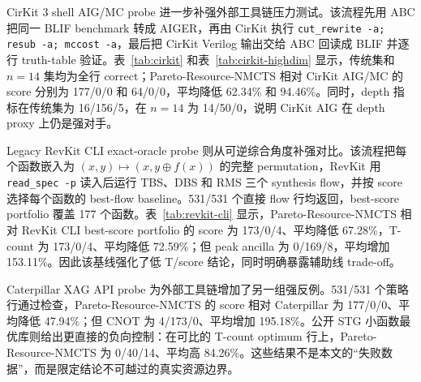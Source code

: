 \documentclass[UTF8,fontset=macnew,11pt]{ctexart}
\newcommand{\method}{Resource-NMCTS}
\newcommand{\xor}{\ensuremath{\oplus}}
\begin{document}
CirKit 3 shell AIG/MC probe 进一步补强外部工具链压力测试。该流程先用 ABC 把同一 BLIF benchmark 转成 AIGER，再由 CirKit 执行 \texttt{cut\_rewrite -a; resub -a; mccost -a}，最后把 CirKit Verilog 输出交给 ABC 回读成 BLIF 并逐行 truth-table 验证。表~\ref{tab:cirkit} 和表~\ref{tab:cirkit-highdim} 显示，传统集和 $n=14$ 集均为全行 correct；Pareto-\method{} 相对 CirKit AIG/MC 的 score 分别为 177/0/0 和 64/0/0，平均降低 62.34\% 和 94.46\%。同时，depth 指标在传统集为 16/156/5，在 $n=14$ 为 14/50/0，说明 CirKit AIG 在 depth proxy 上仍是强对手。

\begin{table}[H]
\centering
\small
\caption{CirKit 3 shell AIG/MC probe：$n\leq6$ 传统函数。负值表示目标方法资源更低。}
\label{tab:cirkit}

\end{table}

\begin{table}[H]
\centering
\small
\caption{CirKit 3 shell AIG/MC probe：$n=14$ 高维函数。负值表示目标方法资源更低。}
\label{tab:cirkit-highdim}

\end{table}

Legacy RevKit CLI exact-oracle probe 则从可逆综合角度补强对比。该流程把每个函数嵌入为 $(x,y)\mapsto(x,y\xor f(x))$ 的完整 permutation，RevKit 用 \texttt{read\_spec -p} 读入后运行 TBS、DBS 和 RMS 三个 synthesis flow，并按 score 选择每个函数的 best-flow baseline。531/531 个直接 flow 行均返回，best-score portfolio 覆盖 177 个函数。表~\ref{tab:revkit-cli} 显示，Pareto-\method{} 相对 RevKit CLI best-score portfolio 的 score 为 173/0/4、平均降低 67.28\%，T-count 为 173/0/4、平均降低 72.59\%；但 peak ancilla 为 0/169/8，平均增加 153.11\%。因此该基线强化了低 T/score 结论，同时明确暴露辅助线 trade-off。

\begin{table}[H]
\centering
\small
\caption{RevKit CLI portfolio：$n\leq6$ 传统函数。负值表示目标方法资源更低。}
\label{tab:revkit-cli}

\end{table}

Caterpillar XAG API probe 为外部工具链增加了另一组强反例。531/531 个策略行通过检查，Pareto-\method{} 的 score 相对 Caterpillar 为 177/0/0、平均降低 47.94\%；但 CNOT 为 4/173/0、平均增加 195.18\%。公开 STG 小函数最优库则给出更直接的负向控制：在可比的 T-count optimum 行上，Pareto-\method{} 为 0/40/14、平均高 84.26\%。这些结果不是本文的“失败数据”，而是限定结论不可越过的真实资源边界。
\end{document}
